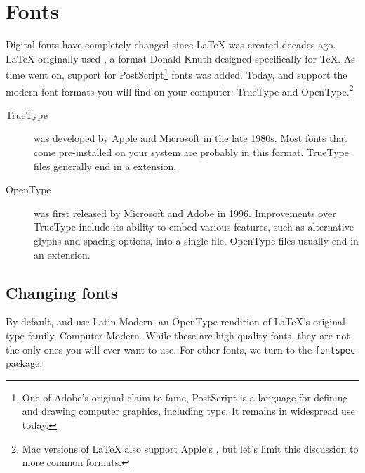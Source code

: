 \chapter{Fonts}
\label{fonts}

Digital fonts have completely changed since \LaTeX{} was created decades ago.
\LaTeX{} originally used \MF,
a format Donald Knuth designed specifically for \TeX{}.
As time went on, support for PostScript\footnote{One of
Adobe's original claim to fame,
PostScript is a language for defining and drawing computer graphics,
including type. It remains in widespread use today.} fonts was added.
Today, \LuaLaTeX{} and \XeLaTeX{} support the modern font formats you will find
on your computer:
TrueType and OpenType.\punckern\footnote{Mac versions of \LaTeX{} also support
Apple's , but let's limit this discussion to
more common formats.}

\begin{description}
\item[TrueType] was developed by Apple and Microsoft in the late 1980s.
    Most fonts that come pre-installed on your system are probably
    in this format.
    TrueType files generally end in a  extension.
\item[OpenType] was first released by Microsoft and Adobe in 1996.
    Improvements over TrueType include its ability to embed
    various features, such as alternative glyphs
    and spacing options, into a single file.
    OpenType files usually end in an  extension.
\end{description}

\section{Changing fonts}

By default, \LuaLaTeX{} and \XeLaTeX{} use Latin Modern,
an OpenType rendition of \LaTeX's original type family, Computer Modern.
While these are high-quality fonts,
they are not the only ones you will ever want to use.
For other fonts, we turn to the \texttt{fontspec} package:

